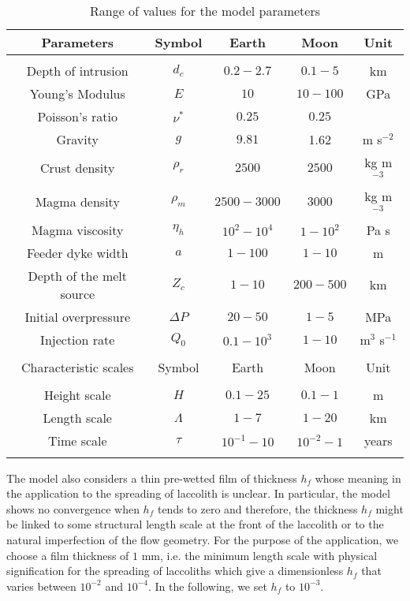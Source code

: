 \begin{table}[h!]
  \caption{Range of values for the model parameters}
  \centering
  \begin{tabular}{c|c|c|c|c}
    Parameters& Symbol & Earth & Moon&Unit\\
    \hline
              &&&&\\
    Depth of intrusion & $d_c$ & $0.2-2.7$ &$0.1-5$ &km \\
    Young's Modulus & $E$ & $10$ &$10-100$ &GPa \\
    Poisson's ratio & $\nu^*$ & $0.25$ &$0.25$ &\\
    Gravity & $g$ & $9.81$ &1.62&m s$^{-2}$ \\
    Crust density & $\rho_{r}$ & $2500$ &$2500$&kg m$^{-3}$ \\
    Magma density & $\rho_{m}$ & $2500-3000$ &$3000$&kg m$^{-3}$ \\
    Magma viscosity & $\eta_h $ & $10^2-10^{4}$ &$1-10^{2}$&Pa s \\
    Feeder dyke width & $a$ & $1-100$ &$1-10$&m \\
    Depth of the melt source & $Z_{c}$ & $ 1-10$&$200-500$& km \\ 
    Initial overpressure & $\Delta P$ & $20-50$ &$1-5$ &MPa \\
    Injection rate & $Q_{0}$ &$0.1-10^3$ &$1-10$&m$^{3}$ s$^{-1}$ \\
              &&&&\\
    \hline
    Characteristic scales & Symbol & Earth & Moon&Unit\\
    \hline
              &&&&\\
    Height scale & $H$& $0.1-25$ &$0.1-1$ &m \\
    Length scale & $\Lambda$ & $1-7$&$1-20$& km \\
    Time scale & $\tau$ & $10^{-1}-10$&$10^{-2}-1$& years \\
    \label{tab2}
  \end{tabular} 
\end{table}

The model  also considers  a thin pre-wetted  film of  thickness $h_f$
whose  meaning in  the application  to the  spreading of  laccolith is
unclear.  In  particular, the  model shows  no convergence  when $h_f$
tends to zero \citep{Lister:2013ia} and therefore, the thickness $h_f$
might be  linked to some structural  length scale at the  front of the
laccolith or  to the natural  imperfection of the flow  geometry.  For
the purpose of the application, we  choose a film thickness of $1$ mm,
i.e.  the  minimum length  scale with  physical signification  for the
spreading of laccoliths  which give a dimensionless  $h_f$ that varies
between $10^{-2}$  and $10^{-4}$.  In  the following, we set  $h_f$ to
$10^{-3}$.

